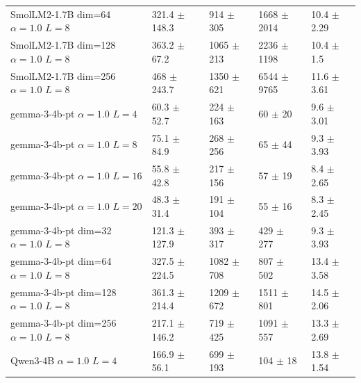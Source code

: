 \begin{tabular}{lllll}
 SmolLM2-1.7B {\small dim=64} {\small $\alpha=1.0$} {\small $L=8$}   & 321.4 {\small $\pm$ 148.3}  & 914 {\small $\pm$ 305}   & 1668 {\small $\pm$ 2014}  & 10.4 {\small $\pm$ 2.29} \\
 SmolLM2-1.7B {\small dim=128} {\small $\alpha=1.0$} {\small $L=8$}  & 363.2 {\small $\pm$ 67.2}   & 1065 {\small $\pm$ 213}  & 2236 {\small $\pm$ 1198}  & 10.4 {\small $\pm$ 1.5}  \\
 SmolLM2-1.7B {\small dim=256} {\small $\alpha=1.0$} {\small $L=8$}  & 468 {\small $\pm$ 243.7}    & 1350 {\small $\pm$ 621}  & 6544 {\small $\pm$ 9765}  & 11.6 {\small $\pm$ 3.61} \\
 \midrule
 gemma-3-4b-pt {\small $\alpha=1.0$} {\small $L=4$}                  & 60.3 {\small $\pm$ 52.7}    & 224 {\small $\pm$ 163}   & 60 {\small $\pm$ 20}      & 9.6 {\small $\pm$ 3.01}  \\
 gemma-3-4b-pt {\small $\alpha=1.0$} {\small $L=8$}                  & 75.1 {\small $\pm$ 84.9}    & 268 {\small $\pm$ 256}   & 65 {\small $\pm$ 44}      & 9.3 {\small $\pm$ 3.93}  \\
 gemma-3-4b-pt {\small $\alpha=1.0$} {\small $L=16$}                 & 55.8 {\small $\pm$ 42.8}    & 217 {\small $\pm$ 156}   & 57 {\small $\pm$ 19}      & 8.4 {\small $\pm$ 2.65}  \\
 gemma-3-4b-pt {\small $\alpha=1.0$} {\small $L=20$}                 & 48.3 {\small $\pm$ 31.4}    & 191 {\small $\pm$ 104}   & 55 {\small $\pm$ 16}      & 8.3 {\small $\pm$ 2.45}  \\
 gemma-3-4b-pt {\small dim=32} {\small $\alpha=1.0$} {\small $L=8$}  & 121.3 {\small $\pm$ 127.9}  & 393 {\small $\pm$ 317}   & 429 {\small $\pm$ 277}    & 9.3 {\small $\pm$ 3.93}  \\
 gemma-3-4b-pt {\small dim=64} {\small $\alpha=1.0$} {\small $L=8$}  & 327.5 {\small $\pm$ 224.5}  & 1082 {\small $\pm$ 708}  & 807 {\small $\pm$ 502}    & 13.4 {\small $\pm$ 3.58} \\
 gemma-3-4b-pt {\small dim=128} {\small $\alpha=1.0$} {\small $L=8$} & 361.3 {\small $\pm$ 214.4}  & 1209 {\small $\pm$ 672}  & 1511 {\small $\pm$ 801}   & 14.5 {\small $\pm$ 2.06} \\
 gemma-3-4b-pt {\small dim=256} {\small $\alpha=1.0$} {\small $L=8$} & 217.1 {\small $\pm$ 146.2}  & 719 {\small $\pm$ 425}   & 1091 {\small $\pm$ 557}   & 13.3 {\small $\pm$ 2.69} \\
 \midrule
 Qwen3-4B {\small $\alpha=1.0$} {\small $L=4$}                       & 166.9 {\small $\pm$ 56.1}   & 699 {\small $\pm$ 193}   & 104 {\small $\pm$ 18}     & 13.8 {\small $\pm$ 1.54} \\

\end{tabular}
